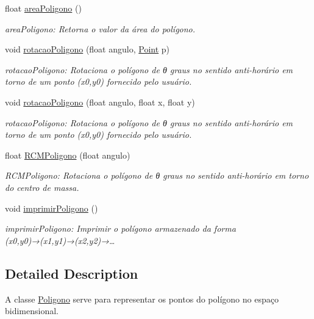 \begin{DoxyCompactItemize}
float \mbox{\hyperlink{class_poligono_ac1e37e274f61dff6c421f972ef1cf891}{area\+Poligono}} ()
\begin{DoxyCompactList}\small\item\em area\+Poligono\+: Retorna o valor da área do polígono. \end{DoxyCompactList}\item 
void \mbox{\hyperlink{class_poligono_ac187000d9b4ee9a33b193ae5d67f09ac}{rotacao\+Poligono}} (float angulo, \mbox{\hyperlink{class_point}{Point}} p)
\begin{DoxyCompactList}\small\item\em rotacao\+Poligono\+: Rotaciona o polígono de θ graus no sentido anti-\/horário em torno de um ponto (x0,y0) fornecido pelo usuário. \end{DoxyCompactList}\item 
void \mbox{\hyperlink{class_poligono_a16fcba48d87f60b030b61a54fd430fdd}{rotacao\+Poligono}} (float angulo, float x, float y)
\begin{DoxyCompactList}\small\item\em rotacao\+Poligono\+: Rotaciona o polígono de θ graus no sentido anti-\/horário em torno de um ponto (x0,y0) fornecido pelo usuário. \end{DoxyCompactList}\item 
float \mbox{\hyperlink{class_poligono_a61ad4f99fde11f7bb3077cd453152a95}{R\+C\+M\+Poligono}} (float angulo)
\begin{DoxyCompactList}\small\item\em R\+C\+M\+Poligono\+: Rotaciona o polígono de θ graus no sentido anti-\/horário em torno do centro de massa. \end{DoxyCompactList}\item 
\mbox{\label{class_poligono_a824ada0183274d23180999c769947aaa}} 
void \mbox{\hyperlink{class_poligono_a824ada0183274d23180999c769947aaa}{imprimir\+Poligono}} ()
\begin{DoxyCompactList}\small\item\em imprimir\+Poligono\+: Imprimir o polígono armazenado da forma (x0,y0)→(x1,y1)→(x2,y2)→…​ \end{DoxyCompactList}\end{DoxyCompactItemize}


\subsection{Detailed Description}
A classe \mbox{\hyperlink{class_poligono}{Poligono}} serve para representar os pontos do polígono no espaço bidimensional. 

